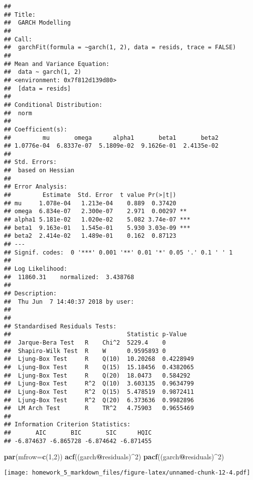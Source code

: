 \documentclass[]{article}
\newenvironment{Shaded}{\begin{snugshade}}{\end{snugshade}}
\newcommand{\KeywordTok}[1]{\textcolor[rgb]{0.13,0.29,0.53}{\textbf{#1}}}
\newcommand{\DataTypeTok}[1]{\textcolor[rgb]{0.13,0.29,0.53}{#1}}
\newcommand{\DecValTok}[1]{\textcolor[rgb]{0.00,0.00,0.81}{#1}}
\newcommand{\OperatorTok}[1]{\textcolor[rgb]{0.81,0.36,0.00}{\textbf{#1}}}
\newcommand{\NormalTok}[1]{#1}
\begin{document}
\begin{verbatim}
## 
## Title:
##  GARCH Modelling 
## 
## Call:
##  garchFit(formula = ~garch(1, 2), data = resids, trace = FALSE) 
## 
## Mean and Variance Equation:
##  data ~ garch(1, 2)
## <environment: 0x7f812d139d80>
##  [data = resids]
## 
## Conditional Distribution:
##  norm 
## 
## Coefficient(s):
##         mu       omega      alpha1       beta1       beta2  
## 1.0776e-04  6.8337e-07  5.1809e-02  9.1626e-01  2.4135e-02  
## 
## Std. Errors:
##  based on Hessian 
## 
## Error Analysis:
##         Estimate  Std. Error  t value Pr(>|t|)    
## mu     1.078e-04   1.213e-04    0.889  0.37420    
## omega  6.834e-07   2.300e-07    2.971  0.00297 ** 
## alpha1 5.181e-02   1.020e-02    5.082 3.74e-07 ***
## beta1  9.163e-01   1.545e-01    5.930 3.03e-09 ***
## beta2  2.414e-02   1.489e-01    0.162  0.87123    
## ---
## Signif. codes:  0 '***' 0.001 '**' 0.01 '*' 0.05 '.' 0.1 ' ' 1
## 
## Log Likelihood:
##  11860.31    normalized:  3.438768 
## 
## Description:
##  Thu Jun  7 14:40:37 2018 by user:  
## 
## 
## Standardised Residuals Tests:
##                                 Statistic p-Value  
##  Jarque-Bera Test   R    Chi^2  5229.4    0        
##  Shapiro-Wilk Test  R    W      0.9595893 0        
##  Ljung-Box Test     R    Q(10)  10.20268  0.4228949
##  Ljung-Box Test     R    Q(15)  15.18456  0.4382065
##  Ljung-Box Test     R    Q(20)  18.0473   0.584292 
##  Ljung-Box Test     R^2  Q(10)  3.603135  0.9634799
##  Ljung-Box Test     R^2  Q(15)  5.478519  0.9872411
##  Ljung-Box Test     R^2  Q(20)  6.373636  0.9982896
##  LM Arch Test       R    TR^2   4.75903   0.9655469
## 
## Information Criterion Statistics:
##       AIC       BIC       SIC      HQIC 
## -6.874637 -6.865728 -6.874642 -6.871455
\end{verbatim}

\begin{Shaded}
\begin{Highlighting}[]
\KeywordTok{par}\NormalTok{(}\DataTypeTok{mfrow=}\KeywordTok{c}\NormalTok{(}\DecValTok{1}\NormalTok{,}\DecValTok{2}\NormalTok{))}
\KeywordTok{acf}\NormalTok{((garch}\OperatorTok{@}\NormalTok{residuals)}\OperatorTok{^}\DecValTok{2}\NormalTok{)}
\KeywordTok{pacf}\NormalTok{((garch}\OperatorTok{@}\NormalTok{residuals)}\OperatorTok{^}\DecValTok{2}\NormalTok{)}
\end{Highlighting}
\end{Shaded}

\texttt{[image: homework\_5\_markdown\_files/figure-latex/unnamed-chunk-12-4.pdf]}
\end{document}
